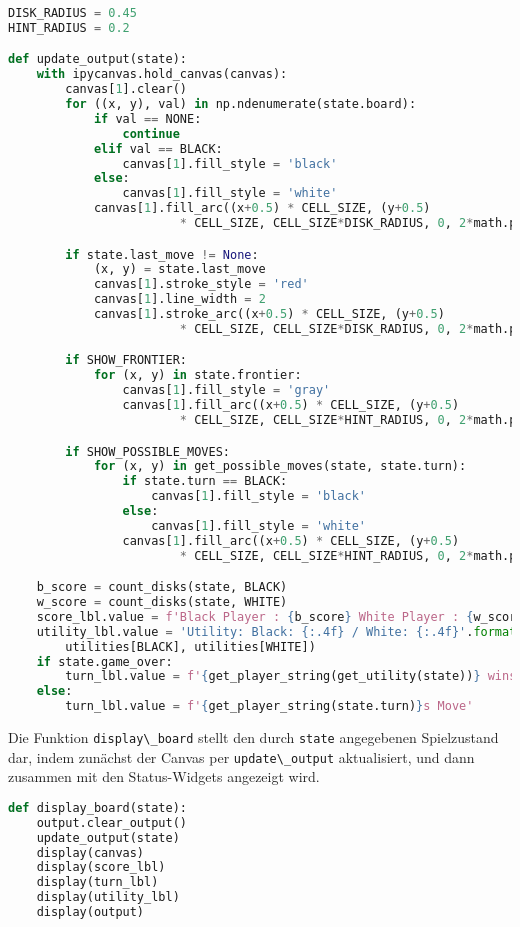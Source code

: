\begin{lstlisting}[language=Python]
DISK_RADIUS = 0.45
HINT_RADIUS = 0.2

def update_output(state):
    with ipycanvas.hold_canvas(canvas):
        canvas[1].clear()
        for ((x, y), val) in np.ndenumerate(state.board):
            if val == NONE:
                continue
            elif val == BLACK:
                canvas[1].fill_style = 'black'
            else:
                canvas[1].fill_style = 'white'
            canvas[1].fill_arc((x+0.5) * CELL_SIZE, (y+0.5)
                        * CELL_SIZE, CELL_SIZE*DISK_RADIUS, 0, 2*math.pi)

        if state.last_move != None:
            (x, y) = state.last_move
            canvas[1].stroke_style = 'red'
            canvas[1].line_width = 2
            canvas[1].stroke_arc((x+0.5) * CELL_SIZE, (y+0.5)
                        * CELL_SIZE, CELL_SIZE*DISK_RADIUS, 0, 2*math.pi)

        if SHOW_FRONTIER:
            for (x, y) in state.frontier:
                canvas[1].fill_style = 'gray'
                canvas[1].fill_arc((x+0.5) * CELL_SIZE, (y+0.5)
                        * CELL_SIZE, CELL_SIZE*HINT_RADIUS, 0, 2*math.pi)

        if SHOW_POSSIBLE_MOVES:
            for (x, y) in get_possible_moves(state, state.turn):
                if state.turn == BLACK:
                    canvas[1].fill_style = 'black'
                else:
                    canvas[1].fill_style = 'white'
                canvas[1].fill_arc((x+0.5) * CELL_SIZE, (y+0.5)
                        * CELL_SIZE, CELL_SIZE*HINT_RADIUS, 0, 2*math.pi)

    b_score = count_disks(state, BLACK)
    w_score = count_disks(state, WHITE)
    score_lbl.value = f'Black Player : {b_score} White Player : {w_score}'
    utility_lbl.value = 'Utility: Black: {:.4f} / White: {:.4f}'.format(
        utilities[BLACK], utilities[WHITE])
    if state.game_over:
        turn_lbl.value = f'{get_player_string(get_utility(state))} wins'
    else:
        turn_lbl.value = f'{get_player_string(state.turn)}s Move'
\end{lstlisting}

Die Funktion \passthrough{\lstinline!display\_board!} stellt den durch
\passthrough{\lstinline!state!} angegebenen Spielzustand dar, indem
zunächst der Canvas per \passthrough{\lstinline!update\_output!}
aktualisiert, und dann zusammen mit den Status-Widgets angezeigt wird.

\begin{lstlisting}[language=Python]
def display_board(state):
    output.clear_output()
    update_output(state)
    display(canvas)
    display(score_lbl)
    display(turn_lbl)
    display(utility_lbl)
    display(output)
\end{lstlisting}

